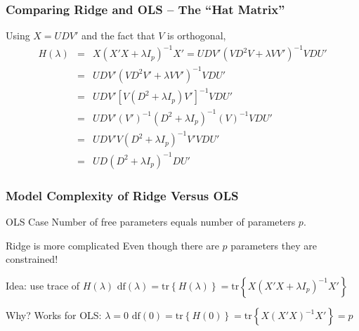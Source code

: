 \begin{frame}
  \frametitle{Comparing Ridge and OLS -- The ``Hat Matrix''}

    Using $X =UDV'$ and the fact that $V$ is orthogonal, 
    \begin{eqnarray*}
      H(\lambda) &=&  X\left( X'X + \lambda I_p \right)^{-1}X' = UDV'\left( VD^2V + \lambda VV' \right)^{-1}VDU'\\
      &=& UDV'\left( VD^2V' + \lambda VV' \right)^{-1}VDU'\\
      &=& UDV'\left[ V(D^2 + \lambda I_p)V' \right]^{-1}VDU'\\
      &=& UDV'\left( V' \right)^{-1}\left( D^2 + \lambda I_p \right)^{-1}\left( V \right)^{-1}VDU'\\
      &=& UDV'V\left( D^2 + \lambda I_p \right)^{-1}V'VDU'\\
      &=& UD\left( D^2 + \lambda I_p \right)^{-1}DU'
    \end{eqnarray*}



\end{frame}
\begin{frame}
  \frametitle{Model Complexity of Ridge Versus OLS}

  \begin{block}{OLS Case}
   Number of free parameters equals number of parameters $p$. 
  \end{block}

  \begin{block}{Ridge is more complicated}
    Even though there are $p$ parameters they are \alert{constrained}! 
  \end{block}

  \begin{block}{Idea: use trace of $H(\lambda)$}
    $\mbox{df}(\lambda) = \mbox{tr}\left\{ H(\lambda) \right\} = \mbox{tr}\left\{ X(X'X + \lambda I_p)^{-1}X' \right\}$
  \end{block}

  \begin{block}{Why? Works for OLS: $\lambda = 0$}
    $\mbox{df}(0) = \mbox{tr}\left\{ H(0) \right\} = \mbox{tr}\left\{ X(X'X)^{-1}X' \right\} = p$
  \end{block}

\end{frame}
